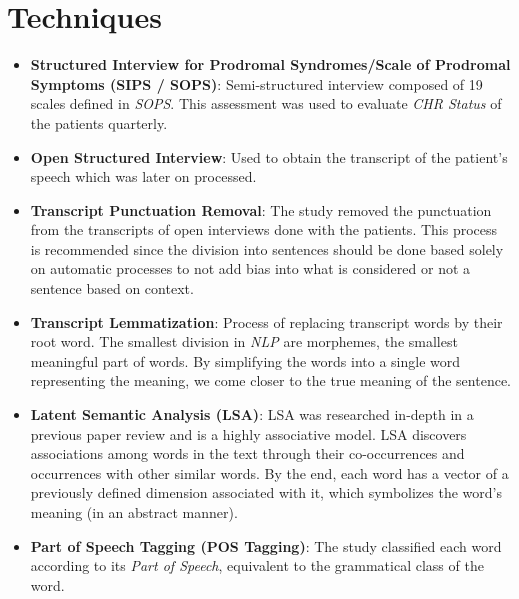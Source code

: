 \documentclass{Paper_Summary}
\begin{document}
\section{Techniques}
    \begin{itemize}
        \item \textbf{Structured Interview for Prodromal Syndromes/Scale of Prodromal Symptoms (SIPS / SOPS)}: Semi-structured interview composed of 19 scales defined in \emph{SOPS}. This assessment was used to evaluate \emph{CHR Status} of the patients quarterly.
        \item \textbf{Open Structured Interview}: Used to obtain the transcript of the patient's speech which was later on processed.
        \item \textbf{Transcript Punctuation Removal}: The study removed the punctuation from the transcripts of open interviews done with the patients. This process is recommended since the division into sentences should be done based solely on automatic processes to not add bias into what is considered or not a sentence based on context.
        \item \textbf{Transcript Lemmatization}: Process of replacing transcript words by their root word. The smallest division in \emph{NLP} are morphemes, the smallest meaningful part of words. By simplifying the words into a single word representing the meaning, we come closer to the true meaning of the sentence.
        \item \textbf{Latent Semantic Analysis (LSA)}: LSA was researched in-depth in a previous paper review and is a highly associative model. LSA discovers associations among words in the text through their co-occurrences and occurrences with other similar words. By the end, each word has a vector of a previously defined dimension associated with it, which symbolizes the word's meaning (in an abstract manner).
        \item \textbf{Part of Speech Tagging (POS Tagging)}: The study classified each word according to its \emph{Part of Speech}, equivalent to the grammatical class of the word.
    \end{itemize}
\end{document}
